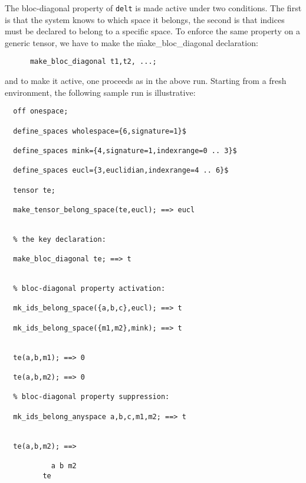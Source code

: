 The bloc-diagonal property of \texttt{delt} is made
active  under two conditions. The first is that the system knows
to which space it belongs, the second is that indices must be
declared to belong to a specific space.
To enforce the same property on a generic tensor, we have to make
the \f{make\_bloc\_diagonal} declaration:
\begin{verbatim}
      make_bloc_diagonal t1,t2, ...;
\end{verbatim}
and to make it active, one proceeds as in the above run.
Starting from a fresh environment, the following sample run
is illustrative:
\begin{verbatim}
  off onespace;

  define_spaces wholespace={6,signature=1}$

  define_spaces mink={4,signature=1,indexrange=0 .. 3}$

  define_spaces eucl={3,euclidian,indexrange=4 .. 6}$

  tensor te;

  make_tensor_belong_space(te,eucl); ==> eucl


  % the key declaration:

  make_bloc_diagonal te; ==> t


  % bloc-diagonal property activation:

  mk_ids_belong_space({a,b,c},eucl); ==> t

  mk_ids_belong_space({m1,m2},mink); ==> t


  te(a,b,m1); ==> 0

  te(a,b,m2); ==> 0

  % bloc-diagonal property suppression:

  mk_ids_belong_anyspace a,b,c,m1,m2; ==> t


  te(a,b,m2); ==>

           a b m2
         te
\end{verbatim}

